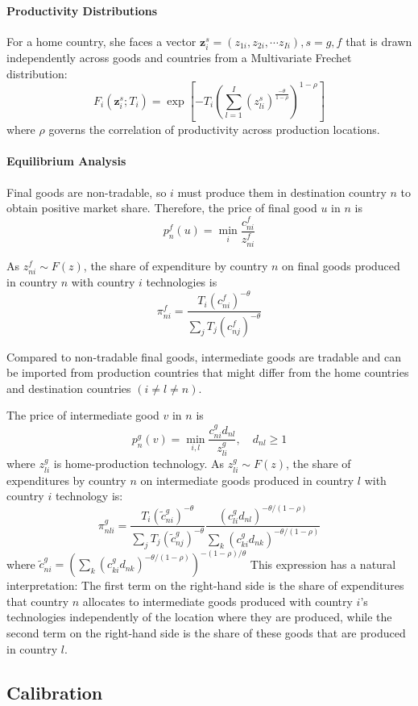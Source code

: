 \paragraph{Productivity Distributions}
For a home country, she faces
a vector $\mathbf{z}_i^s = (z_{1i}, z_{2i}, \cdots z_{Ii}), s = g, f$ that is 
drawn independently across goods and countries from a Multivariate Frechet distribution:
\begin{equation}
    F_i\left(\mathbf{z}_i^s; T_i \right) 
    =\exp \left[-T_i\left(\sum_{l=1}^I\left(z_{l i}^s\right)^{\frac{-\theta}{1-\rho}}\right)^{1-\rho}\right]
\end{equation}
where $\rho$ governs the correlation of productivity across production locations.

\paragraph{Equilibrium Analysis}
Final goods are non-tradable, so $i$ must produce them in destination country $n$ to obtain positive market share.
Therefore, the price of final good $u$ in $n$ is 
\begin{equation*}
    p_n^f(u) = \min_i \frac{c_{ni}^f}{z_{ni}^f}
\end{equation*}

As $z_{ni}^f \sim F(z)$, 
the share of expenditure by country $n$ on final goods produced in country $n$ with country $i$ technologies is 
\begin{equation}
    \pi_{ni}^f = \frac{T_i (c_{ni}^f)^{-\theta}}{\sum_j T_j (c_{nj}^f)^{-\theta}}
\end{equation}


Compared to non-tradable final goods,
intermediate goods are tradable and can be imported from production countries that might differ 
from the home countries and destination countries $(i \neq l \neq n)$.

The price of intermediate good $v$ in $n$ is 
\begin{equation*}
    p_n^g(v) = \min_{i,l} \frac{c_{ni}^g d_{nl}}{z_{li}^g}, \quad d_{nl} \geq 1
\end{equation*}
where $z_{li}^g$ is home-production technology.
As $z_{li}^g \sim F(z)$, 
the share of expenditures by country $n$ on intermediate goods produced in country $l$ with country $i$ technology is:
\begin{equation}
    \pi_{n l i}^g = \frac{T_i\left(\tilde{c}_{n i}^g\right)^{-\theta}
            }{
                \sum_j T_j\left(\tilde{c}_{n j}^g\right)^{-\theta}} 
                \frac{\left(c_{l i}^g d_{n l}\right)^{-\theta /(1-\rho)}
                }{\sum_k\left(c_{k i}^g d_{n k}\right)^{-\theta /(1-\rho)}
                }
\end{equation}
where $\tilde{c}_{n i}^g=\left(\sum_k\left(c_{k i}^g d_{n k}\right)^{-\theta /(1-\rho)}\right)^{-(1-\rho) / \theta}$
This expression has a natural interpretation: 
The first term on the right-hand side is the share of expenditures that country $n$ allocates to intermediate goods produced with
country $i$’s technologies independently of the location where they are produced,
while the second term on the right-hand side is the share of these goods that are produced in country $l$. 

\subsection{Calibration}